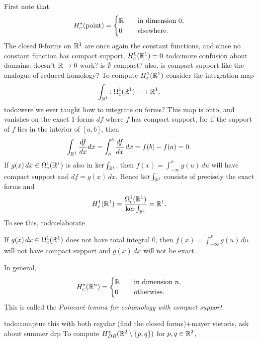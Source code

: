 \begin{example}
First note that 
\[
    H_c^*(\text{point} )=
\begin{cases}
    \mathbb{R}\quad & \text{in dimension}\ 0,\\
    0 & \text{elsewhere.} 
\end{cases}
\]The closed 0-forms on $\mathbb{R}^1$ are once again the constant functions, and since no constant function has compact support, $H^0_c(\mathbb{R}^1)=0$ {\color{red}todo:more confusion about domains: doesn't $\mathbb{R}\to 0$ work? is $\emptyset$ compact? also, is compact support like the analogue of reduced homology?}  To compute $H^1_c(\mathbb{R}^1)$ consider the integration map \[
\int _{\mathbb{R}^1} \colon \Omega^1_c(\mathbb{R}^1) \longrightarrow\mathbb{R}^1.
\] {\color{red}todo:were we ever taught how to integrate on forms?} This map is onto, and vanishes on the exact 1-forms $df$ where $f$ has compact support, for if the support of $f$ lies in the interior of $[a,b]$, then \[
\int_{\mathbb{R}^1} \frac{df}{dx}dx=\int_{a}^{b} \frac{df}{dx} \, dx=f(b)-f(a)=0.
\] If $g(x)\,dx \in \Omega_c^1(\mathbb{R}^1) $ is also in $\ker \int_{\mathbb{R}^1}$, then $f(x)=\int_{-\infty}^{x} g(u) \, du$ will have compact support and $df=g(x)\,dx$. Hence $\ker \int _{\mathbb{R}^1}$ consists of precisely the exact forms and \[
H_c^1(\mathbb{R}^1)= \frac{\Omega_c^1(\mathbb{R}^1)}{\ker \int _{\mathbb{R}^1}}=\mathbb{R}^1.
\] To see this, {\color{red}todo:elaborate} 
\begin{remark}
    If $g(x)\, dx \in \Omega^1_c(\mathbb{R}^1)$ does not have total integral 0, then $f(x)= \int_{-\infty}^{x} g(u) \, du$ will not have compact support and $g(x)\,dx$ will not be exact.
\end{remark}In general, \[
H_c^*(\mathbb{R}^n )=
\begin{cases}
    \mathbb{R}\quad & \text{in dimension} \ n,\\
    0& \text{otherwise.} 
\end{cases}
\] This is called the \emph{Poincar\'e lemma for cohomology with compact support}.
\end{example}

\begin{example}
    {\color{red}todo:comptue this with both regular (find the closed forms)+mayer vietoris, ask about summer drp} 
    To compute $H_{DR}^*(\mathbb{R}^2 \setminus \{p,q\} )$ for $p,q \in \mathbb{R}^2$,
\end{example}

